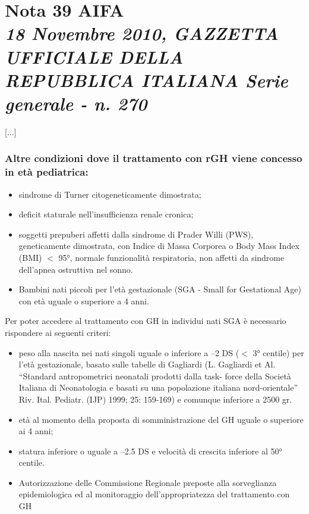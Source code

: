 \chapter[Nota 39 AIFA - 18 Novembre 2010]
	{Nota 39 AIFA\\[.5ex]
	\normalsize\textit{18 Novembre 2010, GAZZETTA UFFICIALE DELLA REPUBBLICA ITALIANA Serie generale - n. 270}}

[...]

\subsection*{Altre condizioni dove il trattamento con rGH viene concesso in et\`a pediatrica:}

\begin{itemize}
\item sindrome di Turner citogeneticamente dimostrata;
\item deficit staturale nell'insufficienza renale cronica;
\item soggetti prepuberi affetti dalla sindrome di Prader Willi (PWS), geneticamente dimostrata, con Indice di Massa Corporea o Body Mass
Index (BMI) $<$ 95°, normale funzionalit\`a respiratoria, non affetti da sindrome dell'apnea ostruttiva nel
sonno.
\item Bambini nati piccoli per l'et\`a gestazionale (SGA - Small for Gestational Age) con et\`a uguale o superiore a
4 anni.
\end{itemize}

Per poter accedere al trattamento con GH in individui nati SGA \`e necessario rispondere ai seguenti criteri:
\begin{itemize}
\item peso alla nascita nei nati singoli uguale o inferiore a –2 DS ($<$ 3° centile) per l'et\`a gestazionale, basato
sulle tabelle di Gagliardi (L. Gagliardi et Al. “Standard antropometrici neonatali prodotti dalla task-
force della Societ\`a Italiana di Neonatologia e basati su una popolazione italiana nord-orientale” Riv.
Ital. Pediatr. (IJP) 1999; 25: 159-169) e comunque inferiore a 2500 gr.
\item et\`a al momento della proposta di somministrazione del GH uguale o superiore ai 4 anni;
\item statura inferiore o uguale a –2.5 DS e velocit\`a di crescita inferiore al 50° centile.
\item Autorizzazione delle Commissione Regionale preposte alla sorveglianza epidemiologica ed al
monitoraggio dell'appropriatezza del trattamento con GH
\end{itemize}

